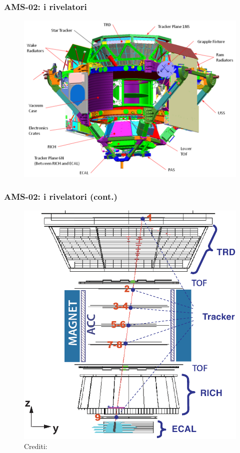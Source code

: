 \documentclass[10pt]{beamer}
\begin{document}
\begin{frame}
  \frametitle{AMS-02: i rivelatori}
  \begin{figure}
    \centering
    \includegraphics[width=.85\columnwidth]{ams-rivelatori}
  \end{figure}
\end{frame}

\begin{frame}
  \frametitle{AMS-02: i rivelatori (cont.)}
  \begin{figure}
    \centering
    \includegraphics[width=.5\columnwidth]{ams-rivelatori2}
    \caption{Crediti: \textcite{2013PhRvL.110n1102A}}
  \end{figure}
\end{frame}
\end{document}
